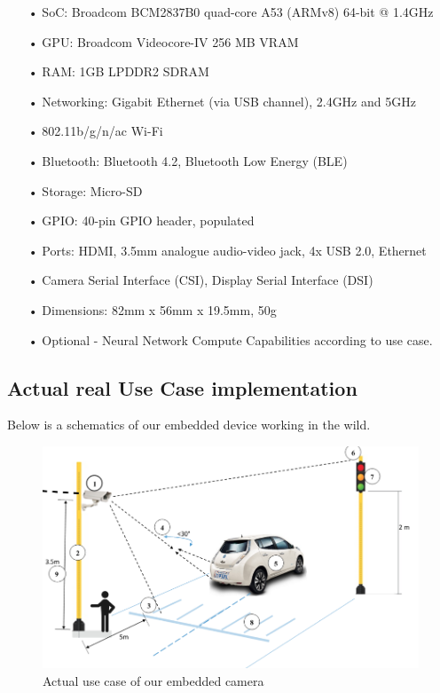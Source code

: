 \begin{itemize}[noitemsep]

\item[•] SoC: Broadcom BCM2837B0 quad-core A53 (ARMv8) 64-bit @ 1.4GHz
\item[•] GPU: Broadcom Videocore-IV 256 MB VRAM
\item[•] RAM: 1GB LPDDR2 SDRAM
\item[•] Networking: Gigabit Ethernet (via USB channel), 2.4GHz and 5GHz 
\item[•] 802.11b/g/n/ac Wi-Fi
\item[•] Bluetooth: Bluetooth 4.2, Bluetooth Low Energy (BLE)
\item[•] Storage: Micro-SD
\item[•] GPIO: 40-pin GPIO header, populated
\item[•] Ports: HDMI, 3.5mm analogue audio-video jack, 4x USB 2.0, Ethernet
\item[•] Camera Serial Interface (CSI), Display Serial Interface (DSI)
\item[•] Dimensions: 82mm x 56mm x 19.5mm, 50g
\item[•] Optional - Neural Network Compute Capabilities according to use case.
\end{itemize}


\subsection{Actual real Use Case implementation}

Below is a schematics of our embedded device working in the wild.

\begin{figure}[H]\centering
	\includegraphics[width=\linewidth]{images/lucam}
	\caption{Actual use case of our embedded camera }
	\label{fig:work_dec}
\end{figure}

